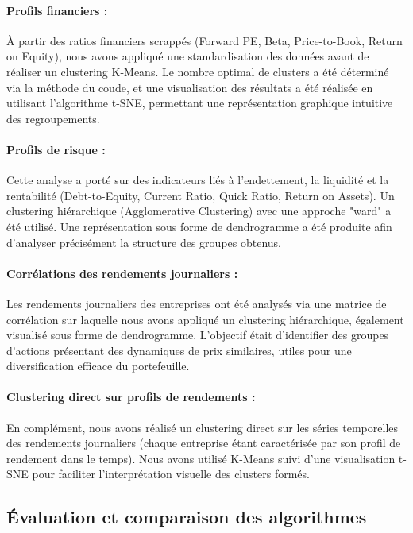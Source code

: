 \documentclass[a4paper,12pt]{article}
\begin{document}
\paragraph{Profils financiers :}  
À partir des ratios financiers scrappés (Forward PE, Beta, Price-to-Book, Return on Equity), nous avons appliqué une standardisation des données avant de réaliser un clustering K-Means. Le nombre optimal de clusters a été déterminé via la méthode du coude, et une visualisation des résultats a été réalisée en utilisant l'algorithme t-SNE, permettant une représentation graphique intuitive des regroupements.

\paragraph{Profils de risque :}  
Cette analyse a porté sur des indicateurs liés à l'endettement, la liquidité et la rentabilité (Debt-to-Equity, Current Ratio, Quick Ratio, Return on Assets). Un clustering hiérarchique (Agglomerative Clustering) avec une approche "ward" a été utilisé. Une représentation sous forme de dendrogramme a été produite afin d’analyser précisément la structure des groupes obtenus.

\paragraph{Corrélations des rendements journaliers :}  
Les rendements journaliers des entreprises ont été analysés via une matrice de corrélation sur laquelle nous avons appliqué un clustering hiérarchique, également visualisé sous forme de dendrogramme. L'objectif était d’identifier des groupes d’actions présentant des dynamiques de prix similaires, utiles pour une diversification efficace du portefeuille.

\paragraph{Clustering direct sur profils de rendements :}  
En complément, nous avons réalisé un clustering direct sur les séries temporelles des rendements journaliers (chaque entreprise étant caractérisée par son profil de rendement dans le temps). Nous avons utilisé K-Means suivi d'une visualisation t-SNE pour faciliter l’interprétation visuelle des clusters formés.

\subsection*{Évaluation et comparaison des algorithmes}
\end{document}
